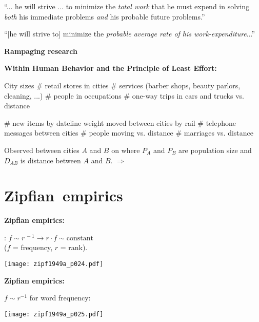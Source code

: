     \smallskip

    {
      ``... he will strive ... to minimize the \textit{total work}
      that he must expend in solving \textit{both}
      his immediate problems \textit{and} his 
      probable future problems.''
    }

    \smallskip

    {
      ``[he will strive to] minimize the \textit{\alert{probable average rate of his work-expenditure}}...''
    }

  


  \textbf{Rampaging research}

  \textbf{Within Human Behavior and the Principle of Least Effort:}
          
      
       City sizes
       \# retail stores in cities
       \# services (barber shops, beauty parlors, cleaning, ...)
       \# people in occupations
       \# one-way trips in cars and trucks vs. distance
      
      
      
       \# new items by dateline
       weight moved between cities by rail
       \# telephone messages between cities
       \# people moving vs. distance
       \# marriages vs. distance
      
      

  
  
   
    Observed 
    between \alert{cities $A$ and $B$} on  where
    $P_A$ and $P_B$ are population size and 
    $D_{AB}$ is distance between $A$ and $B$.
    {$\Rightarrow$ }
  
  


\section{Zipfian\ empirics}

  \textbf{Zipfian empirics:}

  
   : $f \sim r^{\, -1} \rightarrow r\cdot f \sim \mbox{constant}$\\
    ($f$ = frequency, $r$ = rank).
  

  \centering
  \texttt{[image: zipf1949a\_p024.pdf]}


  \textbf{Zipfian empirics:}

  
   $f \sim r^{-1}$ for word frequency:
  

    \centering
    \texttt{[image: zipf1949a\_p025.pdf]}



